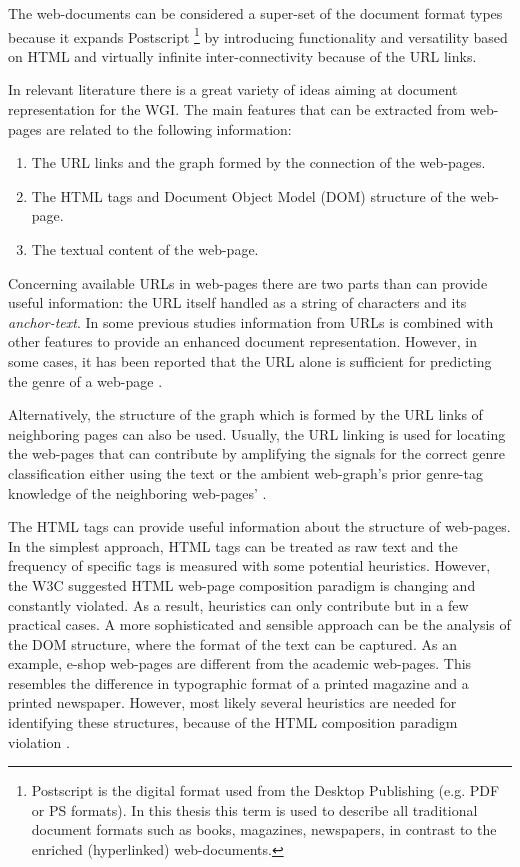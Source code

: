 The web-documents can be considered a super-set of the document format types because it expands Postscript \footnote{Postscript is the digital format used from the Desktop Publishing (e.g. PDF or PS formats). In this thesis this term is used to describe all traditional document formats such as books, magazines, newspapers, in contrast to the enriched (hyperlinked) web-documents.} by introducing functionality and versatility based on HTML and virtually infinite inter-connectivity because of the URL links. 

In relevant literature there is a great variety of ideas aiming at document representation for the WGI. The main features that can be extracted from web-pages are related to the following information:

\begin{enumerate}
\item The URL links and the graph formed by the connection of the web-pages.
\item The HTML tags and Document Object Model (DOM) structure of the web-page. 
\item The textual content of the web-page.
\end{enumerate}

Concerning available URLs in web-pages there are two parts than can provide useful information: the URL itself handled as a string of characters and its \textit{anchor-text}. In some previous studies information from URLs is combined with other features to provide an enhanced document representation. However, in some cases, it has been reported that the URL alone is sufficient for predicting the genre of a web-page \parencite{abramson2012_URL,asheghi2014semi,jebari2014pureURL,priyatam2013don_URL,zhu2011enhance}.

Alternatively, the structure of the graph which is formed by the URL links of neighboring pages can also be used. Usually, the URL linking is used for locating the web-pages that can contribute by amplifying the signals for the correct genre classification either using the text or the ambient web-graph's prior genre-tag knowledge of the neighboring web-pages' \parencite{abramson2012_URL,asheghi2014semi,jebari2014pureURL,priyatam2013don_URL,zhu2011enhance}.

The HTML tags can provide useful information about the structure of web-pages. In the simplest approach, HTML tags can be treated as raw text and the frequency of specific tags is measured with some potential heuristics. However, the W3C suggested HTML web-page composition paradigm is changing and constantly violated. As a result, heuristics can only contribute but in a few practical cases. A more sophisticated and sensible approach can be the analysis of the DOM structure, where the format of the text can be captured. As an example, e-shop web-pages are different from the academic web-pages. This resembles the difference in typographic format of a printed magazine and a printed newspaper. However, most likely several heuristics are needed for identifying these structures, because of the HTML composition paradigm violation \parencite{mehler2011integrating,mehler2011integrating}.

